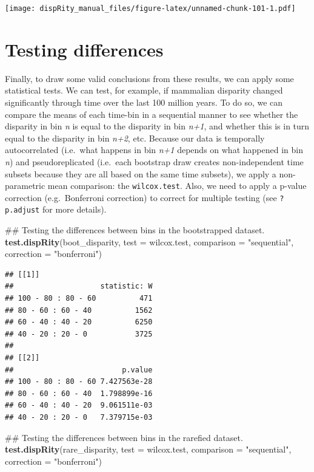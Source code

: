 \documentclass[]{book}
\newenvironment{Shaded}{\begin{snugshade}}{\end{snugshade}}
\newcommand{\KeywordTok}[1]{\textcolor[rgb]{0.13,0.29,0.53}{\textbf{#1}}}
\newcommand{\DataTypeTok}[1]{\textcolor[rgb]{0.13,0.29,0.53}{#1}}
\newcommand{\StringTok}[1]{\textcolor[rgb]{0.31,0.60,0.02}{#1}}
\newcommand{\NormalTok}[1]{#1}
\theoremstyle{definition}
\theoremstyle{definition}
\theoremstyle{remark}
\begin{document}
\texttt{[image: dispRity\_manual\_files/figure-latex/unnamed-chunk-101-1.pdf]}

\section{Testing differences}\label{testing-differences}

Finally, to draw some valid conclusions from these results, we can apply
some statistical tests. We can test, for example, if mammalian disparity
changed significantly through time over the last 100 million years. To
do so, we can compare the means of each time-bin in a sequential manner
to see whether the disparity in bin \emph{n} is equal to the disparity
in bin \emph{n+1}, and whether this is in turn equal to the disparity in
bin \emph{n+2}, etc. Because our data is temporally autocorrelated
(i.e.~what happens in bin \emph{n+1} depends on what happened in bin
\emph{n}) and pseudoreplicated (i.e.~each bootstrap draw creates
non-independent time subsets because they are all based on the same time
subsets), we apply a non-parametric mean comparison: the
\texttt{wilcox.test}. Also, we need to apply a p-value correction
(e.g.~Bonferroni correction) to correct for multiple testing (see
\texttt{?p.adjust} for more details).

\begin{Shaded}
\begin{Highlighting}[]
\NormalTok{## Testing the differences between bins in the bootstrapped dataset.}
\KeywordTok{test.dispRity}\NormalTok{(boot_disparity, }\DataTypeTok{test =}\NormalTok{ wilcox.test, }\DataTypeTok{comparison =} \StringTok{"sequential"}\NormalTok{,}
    \DataTypeTok{correction =} \StringTok{"bonferroni"}\NormalTok{)}
\end{Highlighting}
\end{Shaded}

\begin{verbatim}
## [[1]]
##                    statistic: W
## 100 - 80 : 80 - 60          471
## 80 - 60 : 60 - 40          1562
## 60 - 40 : 40 - 20          6250
## 40 - 20 : 20 - 0           3725
## 
## [[2]]
##                         p.value
## 100 - 80 : 80 - 60 7.427563e-28
## 80 - 60 : 60 - 40  1.798899e-16
## 60 - 40 : 40 - 20  9.061511e-03
## 40 - 20 : 20 - 0   7.379715e-03
\end{verbatim}

\begin{Shaded}
\begin{Highlighting}[]
\NormalTok{## Testing the differences between bins in the rarefied dataset.}
\KeywordTok{test.dispRity}\NormalTok{(rare_disparity, }\DataTypeTok{test =}\NormalTok{ wilcox.test, }\DataTypeTok{comparison =} \StringTok{"sequential"}\NormalTok{,}
    \DataTypeTok{correction =} \StringTok{"bonferroni"}\NormalTok{)}
\end{Highlighting}
\end{Shaded}
\end{document}
